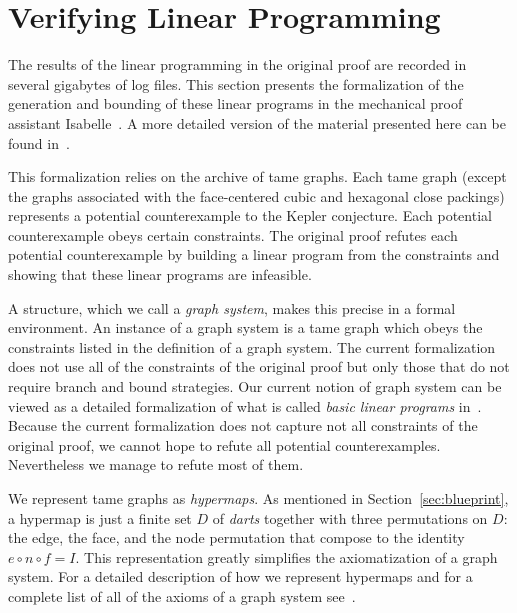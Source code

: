 \documentclass[11pt]{amsart}
\begin{document}
\section{Verifying Linear Programming}
\label{sec:lp}

The results of the linear programming in the original proof are recorded
in several gigabytes of log files.
This section presents the formalization of the generation and bounding of these linear programs 
in the mechanical proof assistant Isabelle~\cite{LNCS2283}. 
A more detailed version of the material presented here can be found in~\cite{obua:phd}.

This formalization relies on the archive of tame graphs. Each tame graph (except the graphs associated with the face-centered cubic and hexagonal close packings) represents a potential counterexample to the Kepler conjecture. 
Each potential counterexample  obeys certain constraints.  The original
proof refutes each potential counterexample by building a linear program
from the constraints and showing that these linear programs are infeasible.

A structure, which we call a \emph{graph system}, makes this precise
in a formal environment.
An instance of a graph system is a tame graph which obeys the constraints listed in the definition of a graph system.
The current formalization does not use all of the constraints of the original proof but only those that do not require branch and bound strategies. Our current notion of graph system can be viewed
as a detailed formalization of what is called \emph{basic linear programs} in~\cite[\S 23.3]{Hales:2006:DCG}. 
Because the current formalization does not capture not all constraints of the original proof, we cannot hope to refute all potential counterexamples. Nevertheless we manage to refute most of them.

We represent tame graphs as \emph{hypermaps}. As mentioned in Section~\ref{sec:blueprint}, 
a hypermap is just a finite set $D$ of \emph{darts} together
with three permutations on $D$: the edge, the face, and the node permutation that compose to the identity $e\circ n\circ f = I$. 
This representation greatly simplifies
the axiomatization of a graph system. For a detailed description of how we represent 
hypermaps and for a complete list of all of the axioms of a graph system see~\cite[\S4]{obua:phd}.
\end{document}
